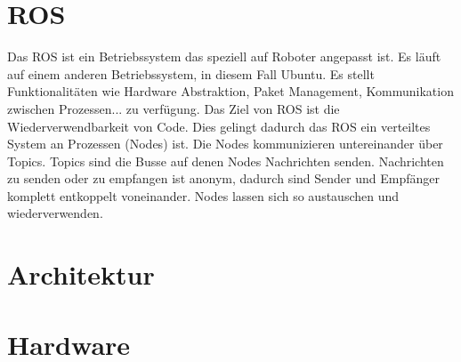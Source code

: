 



\section{ROS}
Das \acf{ROS} ist ein Betriebssystem das speziell auf Roboter angepasst ist.
Es läuft auf einem anderen Betriebssystem, in diesem Fall Ubuntu.
Es stellt Funktionalitäten wie Hardware Abstraktion, Paket Management, Kommunikation zwischen Prozessen... zu verfügung.
Das Ziel von \acf{ROS} ist die Wiederverwendbarkeit von Code. 
Dies gelingt dadurch das \acf{ROS} ein verteiltes System an Prozessen (Nodes) ist. 
Die Nodes kommunizieren untereinander über Topics.
Topics sind die Busse auf denen Nodes Nachrichten senden.
Nachrichten zu senden oder zu empfangen ist anonym, dadurch sind Sender und Empfänger komplett entkoppelt voneinander.
\cite{rosTopics:2019}
Nodes lassen sich so austauschen und wiederverwenden.
\cite{rosIntro:2018}

\section{Architektur}


\section{Hardware}
